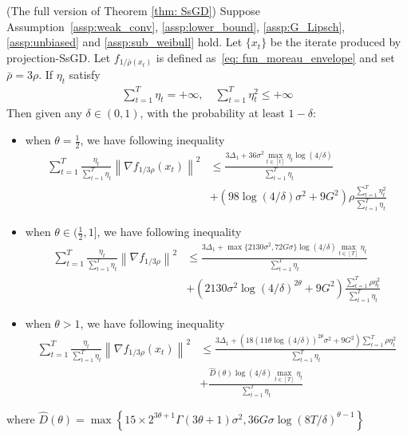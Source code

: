 \documentclass[10pt,a4paper]{amsart}
\def \nab {\nabla}
\def \sumT {\sum_{t=1}^T}
\newcommand{\Brace}[1]{\left(#1\right)}
\newcommand{\norm}[2][]{\left\|#2\right\|^{#1}}
\begin{document}
\begin{theorem}{(The full version of Theorem \ref{thm: SsGD})}\label{app_thm:full_version_projSsGD_general_thm}
    Suppose Assumption~\ref{assp:weak_conv}, \ref{assp:lower_bound}, \ref{assp:G_Lipsch}, \ref{assp:unbiased} and \ref{assp:sub_weibull} hold. Let $\{x_t\}$ be the iterate produced by projection-SsGD. Let $f_{1/\bar{\rho}(x_t)}$ is defined as~\eqref{eq: fun_moreau_envelope} and set $\bar{\rho}=3\rho$. If $\eta_t$ satisfy 
    \begin{align}
        \sum_{t=1}^T \eta_t = +\infty,\quad \sum_{t=1}^T\eta_t^2 \leq +\infty
    \end{align}
    Then given any $\delta\in(0,1)$, with the probability at least $1-\delta$:
    \begin{itemize}
        \item when $\theta=\frac{1}{2} $, we have following inequality
        \begin{align}
            \sumT\frac{\eta_t}{\sumT\eta_t}\norm[2]{\nab f_{1/3\rho}(x_t)} &\leq \frac{3\Delta_1+36\sigma^2\max_{t\in[t]}\eta_t\log(4/\delta)}{\sumT\eta_t}\nonumber\\
            &+\Brace{98\log(4/\delta)\sigma^2+9G^2}\rho\frac{\sumT\eta_t^2}{\sumT\eta_t}  
        \end{align}
        \item when $\theta\in(\frac{1}{2},1]$, we have following inequality 
        \begin{align}
            \sumT \frac{\eta_t}{\sumT\eta_t}\norm[2]{\nab f_{1/3\rho}}&\leq \frac{3\Delta_1+\max\{2130\sigma^2,72G\sigma\}\log(4/\delta)\max_{t\in[T]}\eta_t}{\sumT\eta_t}\nonumber\\
    &+ (2130\sigma^2\log(4/\delta)^{2\theta}+9G^2)\frac{\sumT\rho\eta_t^2}{\sumT\eta_t}
        \end{align}
        \item when $\theta>1$, we have following inequality
        \begin{align}
            \sumT\frac{\eta_t}{\sumT\eta_t}\norm[2]{\nab f_{1/3\rho}(x_t)}&\leq\frac{3\Delta_1+\Brace{18(11\theta\log(4/\delta))^{2\theta}\sigma^2+9G^2}\sumT\rho\eta_t^2}{\sumT\eta_t}\nonumber\\
    &+ \frac{\widehat{D}(\theta)\log(4/\delta)\max_{t\in[T]}\eta_t}{\sumT\eta_t}
        \end{align}
    \end{itemize}
    where $\widehat{D}(\theta)=\max\left\{15\times2^{3\theta+1}\Gamma(3\theta+1)\sigma^2,36G\sigma\log(8T/\delta)^{\theta-1}\right\}$
\end{theorem}
\end{document}
